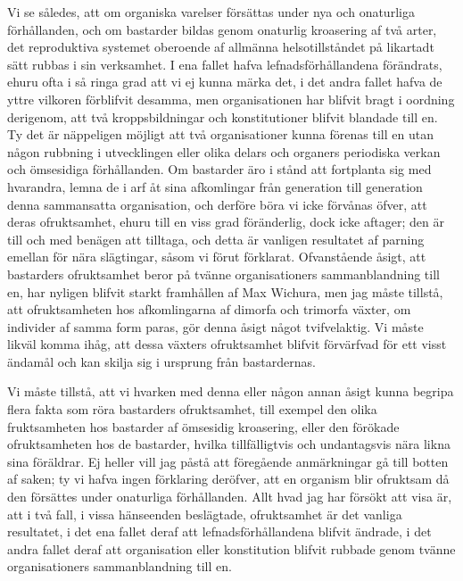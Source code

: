 Vi se således, att om organiska varelser försättas under nya och onaturliga förhållanden, och om bastarder bildas genom onaturlig kroasering af två arter, det reproduktiva systemet oberoende af allmänna helsotillståndet på likartadt sätt rubbas i sin verksamhet. I ena fallet hafva lefnadsförhållandena förändrats, ehuru ofta i så ringa grad att vi ej kunna märka det, i det andra fallet hafva de yttre vilkoren förblifvit desamma, men organisationen har blifvit bragt i oordning derigenom, att två kroppsbildningar och konstitutioner blifvit blandade till en. Ty det är näppeligen möjligt att två organisationer kunna förenas till en utan någon rubbning i utvecklingen eller olika delars och organers periodiska verkan och ömsesidiga förhållanden. Om bastarder äro i stånd att fortplanta sig med hvarandra, lemna de i arf åt sina afkomlingar från generation till generation denna sammansatta organisation, och derföre böra vi icke förvånas öfver, att deras ofruktsamhet, ehuru till en viss grad föränderlig, dock icke aftager; den är till och med benägen att tilltaga, och detta är vanligen resultatet af parning emellan för nära slägtingar, såsom vi förut förklarat. Ofvanstående åsigt, att bastarders ofruktsamhet beror på tvänne organisationers sammanblandning till en, har nyligen blifvit starkt framhållen af Max Wichura, men jag måste tillstå, att ofruktsamheten hos afkomlingarna af dimorfa och trimorfa växter, om individer af samma form paras, gör denna åsigt något tvifvelaktig. Vi måste likväl komma ihåg, att dessa växters ofruktsamhet blifvit förvärfvad för ett visst ändamål och kan skilja sig i ursprung från bastardernas.

Vi måste tillstå, att vi hvarken med denna eller någon annan åsigt kunna begripa flera fakta som röra bastarders ofruktsamhet, till exempel den olika fruktsamheten hos bastarder af ömsesidig kroasering, eller den förökade ofruktsamheten hos de bastarder, hvilka tillfälligtvis och undantagsvis nära likna sina föräldrar. Ej heller vill jag påstå att föregående anmärkningar gå till botten af saken; ty vi hafva ingen förklaring deröfver, att en organism blir ofruktsam då den försättes under onaturliga förhållanden. Allt hvad jag har försökt att visa är, att i två fall, i vissa hänseenden beslägtade, ofruktsamhet är det vanliga resultatet, i det ena fallet deraf att lefnadsförhållandena blifvit ändrade, i det andra fallet deraf att organisation eller konstitution blifvit rubbade genom tvänne organisationers sammanblandning till en.

